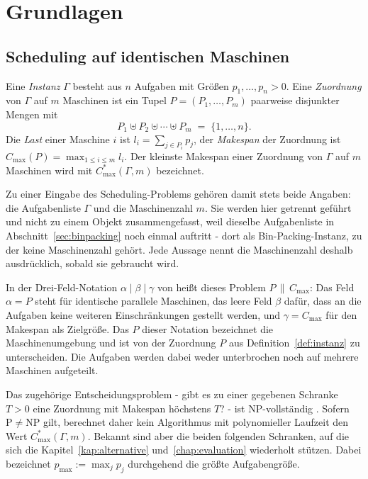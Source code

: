 \chapter{Grundlagen}
\label{chap:grundlagen}

\section{Scheduling auf identischen Maschinen}
\label{sec:problem}

\begin{definition}
\label{def:instanz}
Eine \emph{Instanz} $\Gamma$ besteht aus $n$ Aufgaben mit Größen $p_1, \ldots, p_n > 0$.
Eine \emph{Zuordnung} von $\Gamma$ auf $m$ Maschinen ist ein Tupel $P = (P_1, \ldots, P_m)$
paarweise disjunkter Mengen mit
\[
  P_1 \uplus P_2 \uplus \cdots \uplus P_m \;=\; \{1, \ldots, n\} .
\]
Die \emph{Last} einer Maschine $i$ ist $l_i = \sum_{j \in P_i} p_j$, der \emph{Makespan} der
Zuordnung ist $C_{\max}(P) = \max_{1 \le i \le m} l_i$.
Der kleinste Makespan einer Zuordnung von $\Gamma$ auf $m$ Maschinen wird mit
$C^{*}_{\max}(\Gamma, m)$ bezeichnet.
\end{definition}

Zu einer Eingabe des Scheduling-Problems gehören damit stets beide Angaben: die Aufgabenliste
$\Gamma$ und die Maschinenzahl $m$.
Sie werden hier getrennt geführt und nicht zu einem Objekt zusammengefasst, weil dieselbe
Aufgabenliste in Abschnitt~\ref{sec:binpacking} noch einmal auftritt - dort als
Bin-Packing-Instanz, zu der keine Maschinenzahl gehört.
Jede Aussage nennt die Maschinenzahl deshalb ausdrücklich, sobald sie gebraucht wird.

In der Drei-Feld-Notation $\alpha \mid \beta \mid \gamma$ von \textcite{graham1979} heißt dieses
Problem $P\,\|\,C_{\max}$: Das Feld $\alpha = P$ steht für identische parallele Maschinen, das
leere Feld $\beta$ dafür, dass an die Aufgaben keine weiteren Einschränkungen gestellt werden, und
$\gamma = C_{\max}$ für den Makespan als Zielgröße.
Das $P$ dieser Notation bezeichnet die Maschinenumgebung und ist von der Zuordnung $P$ aus
Definition~\ref{def:instanz} zu unterscheiden.
Die Aufgaben werden dabei weder unterbrochen noch auf mehrere Maschinen aufgeteilt.

Das zugehörige Entscheidungsproblem - gibt es zu einer gegebenen Schranke $T > 0$ eine Zuordnung
mit Makespan höchstens $T$? - ist NP-vollständig \cite{garey_johnson1979}.
Sofern $\mathrm{P} \ne \mathrm{NP}$ gilt, berechnet daher kein Algorithmus mit polynomieller
Laufzeit den Wert $C^{*}_{\max}(\Gamma, m)$.
Bekannt sind aber die beiden folgenden Schranken, auf die sich die Kapitel~\ref{kap:alternative}
und~\ref{chap:evaluation} wiederholt stützen.
Dabei bezeichnet $p_{\max} := \max_j p_j$ durchgehend die größte Aufgabengröße.

